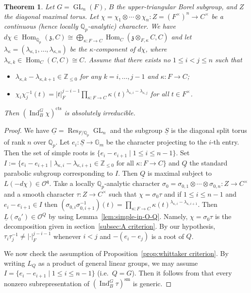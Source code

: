 \documentclass[a4paper]{amsart}
\numberwithin{equation}{section}
\newtheorem{thm}{Theorem}[section]
\theoremstyle{remark}
\theoremstyle{definition}
\DeclareMathOperator{\Ind}{Ind}
\DeclareMathOperator{\Hom}{Hom}
\DeclareMathOperator{\Res}{Res}
\newcommand{\Z}{\mathbb{Z}}
\newcommand{\Q}{\mathbb{Q}}
\DeclareMathOperator{\GL}{GL}
\newcommand{\sm}{\mathrm{sm}}
\newcommand{\alggrp}[1]{\underline{#1}}
\newcommand{\cts}{\mathrm{cts}}
\renewcommand{\simeq}{\cong}
\begin{document}
\begin{thm}\label{thm:GLn-irred}
  Let $G = \GL_{n}(F)$, $B$ the upper-triangular Borel subgroup, and $Z$ the diagonal maximal torus.
  Let $\chi = \chi_{1}\otimes\cdots\otimes\chi_{n}\colon Z = (F^\times)^n \to C^{\times}$ be a continuous (hence locally $\Q_{p}$-analytic) character.
  We have $d\chi\in \Hom_{\Q_{p}}(\mathfrak{z},C)\simeq \bigoplus_{\kappa\colon F\to C}\Hom_{C}(\mathfrak{z} \otimes_{F,\kappa} C,C)$ and let $\lambda_{\kappa} = (\lambda_{\kappa,1},\ldots,\lambda_{\kappa,n})$ be the $\kappa$-component of $d\chi$, where $\lambda_{\kappa,k}\in \Hom_{C}(C,C)\simeq C$.
  Assume that there exists no $1\le i < j \le n$ such that 
  \begin{itemize}
  \item $\lambda_{\kappa,k} - \lambda_{\kappa,k + 1}\in \Z_{\le 0}$ for any $k = i,\ldots,j - 1$ and $\kappa\colon F\to C$;
  \item $\chi_{i}\chi_{j}^{-1}(t) = \lvert t\rvert_F^{j - i - 1}\prod_{\kappa\colon F\to C}\kappa(t)^{\lambda_{\kappa,i} - \lambda_{\kappa,j}}$ for all $t\in F^{\times}$.
  \end{itemize}
  Then $(\Ind_{B}^{G}\chi)^{\cts}$ is absolutely irreducible.
\end{thm}
\begin{proof}
We have $\alggrp{G} = \Res_{F/\Q_{p}}\GL_{n}$ and the subgroup $\alggrp{S}$ is the diagonal split torus of rank $n$ over $\Q_p$. Let $e_{i}\colon \alggrp{S}\to \mathbb{G}_{m}$ be the character projecting to the $i$-th entry.
Then the set of simple roots is $\{e_{i} - e_{i + 1}\mid 1\le i\le n - 1\}$.
Set $I := \{e_{i} - e_{i + 1}\mid \text{$\lambda_{\kappa,i} - \lambda_{\kappa,i + 1}\in \Z_{\le 0}$ for all $\kappa\colon F\to C$}\}$ and $\alggrp Q$ the standard parabolic subgroup corresponding to $I$. Then $\alggrp Q$ is maximal subject to $L(-d\chi)\in \mathcal{O}^{\mathfrak{q}}$.
Take a locally $\Q_{p}$-analytic character $\sigma_{0} = \sigma_{0,1}\otimes\cdots\otimes \sigma_{0,n}\colon Z\to C^{\times}$ and a smooth character $\tau\colon Z\to C^{\times}$ such that $\chi = \sigma_{0}\tau$ and if $1 \le i\le n-1$ and $e_{i} - e_{i + 1} \in I$ then $(\sigma_{0,i}\sigma_{0,i + 1}^{-1})(t) = \prod_{\kappa\colon F\to C}\kappa(t)^{\lambda_{\kappa,i} - \lambda_{\kappa,i + 1}}$.
Then $\underline{L}(\sigma_{0}')\in \mathcal{O}^{Q}$ by using Lemma~\ref{lem:simple-in-O-Q}.
Namely, $\chi = \sigma_{0}\tau$ is the decomposition given in section~\ref{subsec:A criterion}.
By our hypothesis, $\tau_i\tau_j^{-1} \ne \lvert \cdot\rvert_F^{j - i - 1}$ whenever $i < j$ and $-(e_i - e_j)$ is a root of $Q$.

We now check the assumption of Proposition~\ref{prop:whittaker criterion}.
By writing $L_Q$ as a product of general linear groups, we may assume $I = \{e_{i} - e_{i + 1}\mid 1\le i \le n - 1\}$ (i.e.\ $Q = G$).
Then it follows from \cite[4.11 Theorem]{MR0579172} that every nonzero subrepresentation of $(\Ind_{B}^{G}\tau)^{\sm}$ is generic.
\end{proof}
\end{document}
